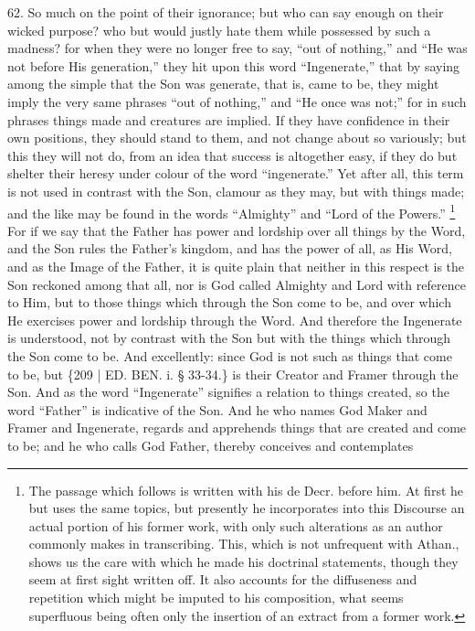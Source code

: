 62. So much on the point of
their ignorance; but who can say enough on their wicked purpose? who
but would justly hate them while possessed by such a madness?
for when they were no longer free to say, ``out of nothing,'' and ``He
was not before His generation,'' they hit upon this word ``Ingenerate,''
that by saying among the simple that the Son was generate, that is,
came to be, they might imply the very same phrases ``out of nothing,''
and ``He once was not;'' for in such phrases things made and creatures
are implied. If they have confidence in their own positions, they
should stand to them, and not change about so variously; but this they
will not do, from an idea that success is altogether easy, if they do
but shelter their heresy under colour of the word ``ingenerate.'' Yet
after all, this term is not used in contrast with the Son, clamour as
they may, but with things made; and the like may be found in the words
``Almighty'' and ``Lord of the Powers.'' \footnote{The passage which follows is written with his de Decr. before him. At
first he but uses the same topics, but presently he incorporates into
this Discourse an actual portion of his former work, with only such
alterations as an author commonly makes in transcribing. This, which
is not unfrequent with Athan., shows us the care with which he made
his doctrinal statements, though they seem at first sight written off.
It also accounts for the diffuseness and repetition which might be
imputed to his composition, what seems superfluous being often only
the insertion of an extract from a former work.} For if we say that the Father has power and lordship over all
things by the Word, and the Son rules the Father's kingdom, and has
the power of all, as His Word, and as the Image of the Father, it is
quite plain that neither in this respect is the Son reckoned among
that all, nor is God called Almighty and Lord with reference to Him,
but to those things which through the Son come to be, and over which
He exercises power and lordship through the Word. And therefore the
Ingenerate is understood, not by contrast with the Son but with the
things which through the Son come to be. And excellently: since God is
not such as things that come to be, but \{209 | ED. BEN.
i. § 33-34.\} is their Creator and Framer through the Son. And as the
word ``Ingenerate'' signifies a relation to things created, so the word ``Father''
is indicative of the Son. And he who names God Maker and Framer and
Ingenerate, regards and apprehends things that are created and come to
be; and he who calls God Father, thereby conceives and contemplates
